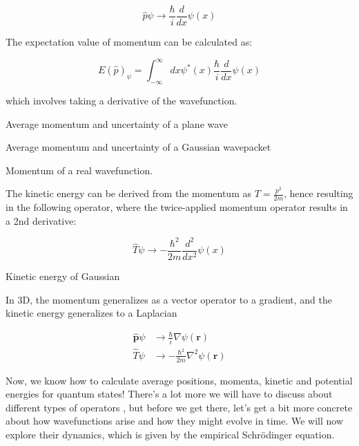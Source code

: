 \begin{equation}
	\hat{p} \psi \to \frac{\hbar}{i} \frac{d}{dx}\psi(x)
\end{equation}

The expectation value of momentum can be calculated as:

\begin{equation}
	E(\hat{p})_{\psi} = \int_{-\infty}^{\infty} dx \psi^*(x)\frac{\hbar}{i}\frac{d}{dx} \psi(x) 
\end{equation}

which involves taking a derivative of the wavefunction. 

\begin{example}
	Average momentum and uncertainty of a plane wave
\end{example}

\begin{example}
	Average momentum and uncertainty of a Gaussian wavepacket
\end{example}

\begin{example}
	Momentum of a real wavefunction.
\end{example}

The kinetic energy can be derived from the momentum as $ T = \frac{p^2}{2m}$, hence resulting in the following operator, where the twice-applied momentum operator results in a 2nd derivative:

\begin{equation}
	\hat{T}\psi \to -\frac{\hbar^2}{2m}\frac{d^2}{dx^2}\psi(x)
\end{equation}

\begin{example}
	Kinetic energy of Gaussian
\end{example}

In 3D, the momentum generalizes as a vector operator to a gradient, and the kinetic energy generalizes to a Laplacian

\begin{align}
	\hat{\mathbf{p}}\psi &\to \frac{\hbar}{i} \nabla \psi(\mathbf{r}) \\
	\hat{T}\psi &\to -\frac{\hbar^2}{2m} \nabla^2 \psi(\mathbf{r})
\end{align}

Now, we know how to calculate average positions, momenta, kinetic and potential energies for quantum states! There's a lot more we will have to discuss about different types of operators , but before we get there, let's get a bit more concrete about how wavefunctions arise and how they might evolve in time. We will now explore their dynamics, which is given by the empirical Schr\"{o}dinger equation. 

